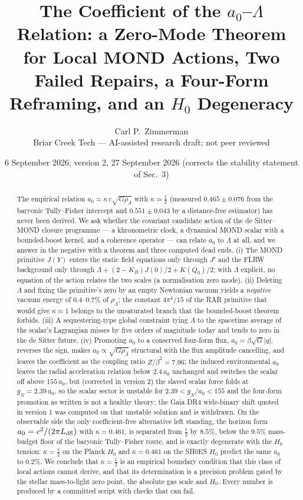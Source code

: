 \documentclass[11pt,letterpaper]{article}
\title{The Coefficient of the $a_0$--$\Lambda$ Relation: a Zero-Mode Theorem for Local MOND Actions, Two Failed Repairs, a Four-Form Reframing, and an $H_0$ Degeneracy}
\author{Carl P.\ Zimmerman\\ \small Briar Creek Tech --- AI-assisted research draft; not peer reviewed}
\date{6 September 2026; version 2, 27 September 2026 (corrects the stability statement of Sec.~3)}
\begin{document}
\maketitle
\begin{abstract}
The empirical relation $a_0=\kappa\,c\sqrt{G\rho_\Lambda}$ with $\kappa\simeq\tfrac12$ (measured $0.465\pm0.076$ from the baryonic Tully--Fisher intercept and $0.551\pm0.043$ by a distance-free estimator) has never been derived. We ask whether the covariant candidate action of the de Sitter--MOND closure programme --- a khronometric clock, a dynamical MOND scalar with a bounded-boost kernel, and a coherence operator --- can relate $a_0$ to $\Lambda$ at all, and we answer in the negative with a theorem and three computed dead ends. (i) The MOND primitive $J(Y)$ enters the static field equations only through $J'$ and the FLRW background only through $\Lambda+(2-K_B)J(0)/2+K(Q_0)/2$; with $\Lambda$ explicit, no equation of the action relates the two scales (a normalisation zero mode). (ii) Deleting $\Lambda$ and fixing the primitive's zero by an empty Newtonian vacuum yields a \emph{negative} vacuum energy of $0.4$--$0.7\%$ of $\rho_\Lambda$; the constant $4\pi^4/15$ of the RAR primitive that would give $\kappa\approx1$ belongs to the unsaturated branch that the bounded-boost theorem forbids. (iii) A sequestering-type global constraint tying $\Lambda$ to the spacetime average of the scalar's Lagrangian misses by five orders of magnitude today and tends to zero in the de Sitter future. (iv) Promoting $a_0$ to a conserved four-form flux, $a_0=\beta\sqrt G|q|$, reverses the sign, makes $a_0\propto\sqrt{G\rho_\Lambda}$ structural with the flux amplitude cancelling, and leaves the coefficient as the coupling ratio $Z/\beta^2=7.96$; the induced environmental $a_0$ leaves the radial acceleration relation below $2.4\,a_0$ unchanged and switches the scalar off above $155\,a_0$, but (corrected in version 2) the slaved scalar force folds at $g_N=2.39\,a_0$, so the scalar sector is unstable for $2.39<g_N/a_0<155$ and the four-form promotion as written is not a healthy theory; the Gaia DR4 wide-binary shift quoted in version 1 was computed on that unstable solution and is withdrawn. On the observable side the only coefficient-free alternative left standing, the horizon form $a_0=c^2/(2\pi L_{\rm dS})$ with $\kappa=0.461$, is separated from $\tfrac12$ by $8.5\%$, below the $9.5\%$ mass-budget floor of the baryonic Tully--Fisher route, and is exactly degenerate with the $H_0$ tension: $\kappa=\tfrac12$ on the Planck $H_0$ and $\kappa=0.461$ on the SH0ES $H_0$ predict the same $a_0$ to $0.2\%$. We conclude that $\kappa=\tfrac12$ is an empirical boundary condition that this class of local actions cannot derive, and that its determination is a precision problem gated by the stellar mass-to-light zero point, the absolute gas scale and $H_0$. Every number is produced by a committed script with checks that can fail.
\end{abstract}
\end{document}
